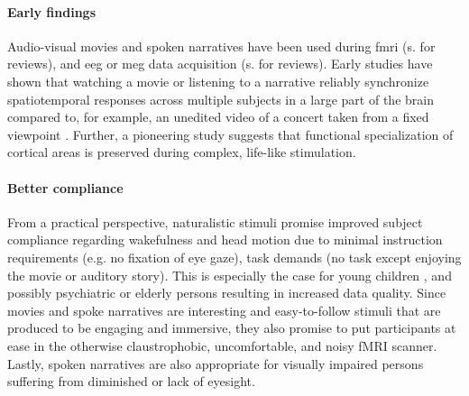\paragraph{Early findings}
Audio-visual movies and spoken narratives have been used during \ac{fmri}
(s.\citep{hamilton2018revolution, hasson2008neurocinematics,
sonkusare2019naturalistic, saarimaki2021naturalistic} for reviews), and \ac{eeg}
or \ac{meg} data acquisition (s. \citep{alday2019meg, kandylaki2019story} for
reviews).
%
Early studies have shown that watching a movie \citep{hasson2004intersubject,
hasson2008neurocinematics, hasson2010reliability} or listening to a narrative
\citep{lerner2011topographic, wilson2008beyond} reliably synchronize
spatiotemporal responses across multiple subjects in a large part of the brain
compared to, for example, an unedited video of a concert taken from a fixed
viewpoint \citep{hasson2004intersubject, hasson2008neurocinematics,
hasson2010reliability, lerner2011topographic, wilson2008beyond}.
%
Further, a pioneering study \citep{bartels2004mapping} suggests that functional
specialization of cortical areas is preserved during complex, life-like
stimulation.


\paragraph{Better compliance}
%
From a practical perspective, naturalistic stimuli promise improved subject
compliance regarding wakefulness and head motion due to minimal instruction
requirements (e.g. no fixation of eye gaze), task demands (no task except
enjoying the movie or auditory story).
%
This is especially the case for young children \citep{vanderwal2015inscapes},
and possibly psychiatric \citep{eickhoff2020towards} or elderly persons
resulting in increased data quality.
%
Since movies and spoke narratives are interesting and easy-to-follow stimuli
that are produced to be engaging and immersive, they also promise to put
participants at ease in the otherwise claustrophobic, uncomfortable, and noisy
fMRI scanner.
%
Lastly, spoken narratives are also appropriate for visually impaired persons
suffering from diminished or lack of eyesight.


